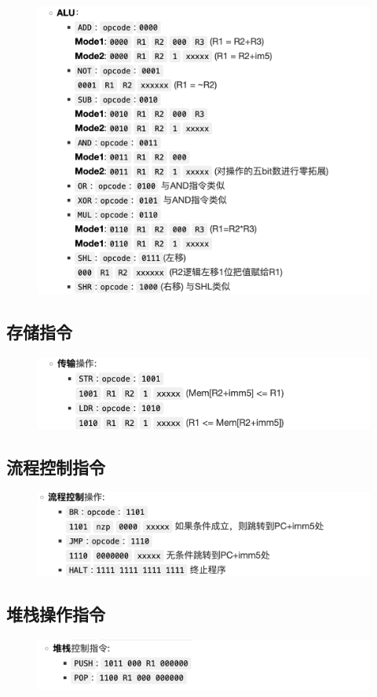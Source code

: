 \documentclass{article}
\begin{document}
\begin{figure}[H]
    \centering
    \includegraphics[width=1\textwidth]{pic/22.png}
   
    \end{figure}
    

\subsection{存储指令}
\begin{figure}[H]
    \centering
    \includegraphics[width=1\textwidth]{pic/23.png}
   
    \end{figure}

\subsection{流程控制指令}
\begin{figure}[H]
    \centering
    \includegraphics[width=1\textwidth]{pic/24.png}
   
    \end{figure}

\subsection{堆栈操作指令}
\begin{figure}[H]
    \centering
    \includegraphics[width=1\textwidth]{pic/25.png}
   
    \end{figure}
\end{document}
